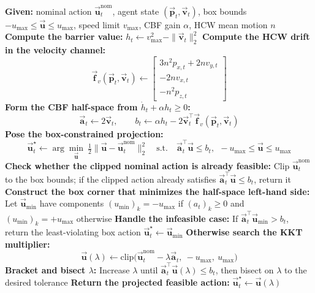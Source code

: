 \begin{algorithm}[H]
\caption{Velocity CBF-QP Saturation Filter}
\label{alg:velocity-cbf-qp}
\begin{algorithmic}[1]
\State \textbf{Given:} nominal action $\vec{\mathbf{u}}_t^{\mathrm{nom}}$, agent state $(\vec{\mathbf{p}}_t,\vec{\mathbf{v}}_t)$, box bounds $-u_{\max}\le \vec{\mathbf{u}}\le u_{\max}$, speed limit $v_{\max}$, CBF gain $\alpha$, HCW mean motion $n$
\State \textbf{Compute the barrier value:}
\State \hspace{1em} $h_t \leftarrow v_{\max}^2-\|\vec{\mathbf{v}}_t\|_2^2$
\State \textbf{Compute the HCW drift in the velocity channel:}
\State \hspace{1em}
\[
\vec{\mathbf{f}}_v(\vec{\mathbf{p}}_t,\vec{\mathbf{v}}_t)\leftarrow
\begin{bmatrix}
3n^2 p_{x,t}+2n v_{y,t}\\
-2n v_{x,t}\\
-n^2 p_{z,t}
\end{bmatrix}
\]
\State \textbf{Form the CBF half-space from $\dot h_t+\alpha h_t\ge 0$:}
\State \hspace{1em}
\[
\vec{\mathbf{a}}_t \leftarrow 2\vec{\mathbf{v}}_t,\qquad
b_t \leftarrow \alpha h_t - 2 \vec{\mathbf{v}}_t^\top \vec{\mathbf{f}}_v(\vec{\mathbf{p}}_t,\vec{\mathbf{v}}_t)
\]
\State \textbf{Pose the box-constrained projection:}
\State \hspace{1em}
\[
\vec{\mathbf{u}}_t^\star \leftarrow
\arg\min_{\vec{\mathbf{u}}}\ \tfrac12\|\vec{\mathbf{u}}-\vec{\mathbf{u}}_t^{\mathrm{nom}}\|_2^2
\quad\text{s.t.}\quad
\vec{\mathbf{a}}_t^\top \vec{\mathbf{u}} \le b_t,\ \ -u_{\max}\le \vec{\mathbf{u}}\le u_{\max}
\]
\State \textbf{Check whether the clipped nominal action is already feasible:}
\State \hspace{1em} Clip $\vec{\mathbf{u}}_t^{\mathrm{nom}}$ to the box bounds; if the clipped action already satisfies $\vec{\mathbf{a}}_t^\top \vec{\mathbf{u}} \le b_t$, return it
\State \textbf{Construct the box corner that minimizes the half-space left-hand side:}
\State \hspace{1em} Let $\vec{\mathbf{u}}_{\min}$ have components $(u_{\min})_k=-u_{\max}$ if $(a_t)_k\ge 0$ and $(u_{\min})_k=+u_{\max}$ otherwise
\State \textbf{Handle the infeasible case:}
\State \hspace{1em} If $\vec{\mathbf{a}}_t^\top \vec{\mathbf{u}}_{\min}>b_t$, return the least-violating box action $\vec{\mathbf{u}}_t^\star\leftarrow \vec{\mathbf{u}}_{\min}$
\State \textbf{Otherwise search the KKT multiplier:}
\State \hspace{1em}
\[
\vec{\mathbf{u}}(\lambda)\leftarrow \mathrm{clip}\!\big(\vec{\mathbf{u}}_t^{\mathrm{nom}}-\lambda \vec{\mathbf{a}}_t,\ -u_{\max},\ u_{\max}\big)
\]
\State \textbf{Bracket and bisect $\lambda$:}
\State \hspace{1em} Increase $\lambda$ until $\vec{\mathbf{a}}_t^\top \vec{\mathbf{u}}(\lambda)\le b_t$, then bisect on $\lambda$ to the desired tolerance
\State \textbf{Return the projected feasible action:}
\State \hspace{1em} $\vec{\mathbf{u}}_t^\star \leftarrow \vec{\mathbf{u}}(\lambda)$
\end{algorithmic}
\end{algorithm}


